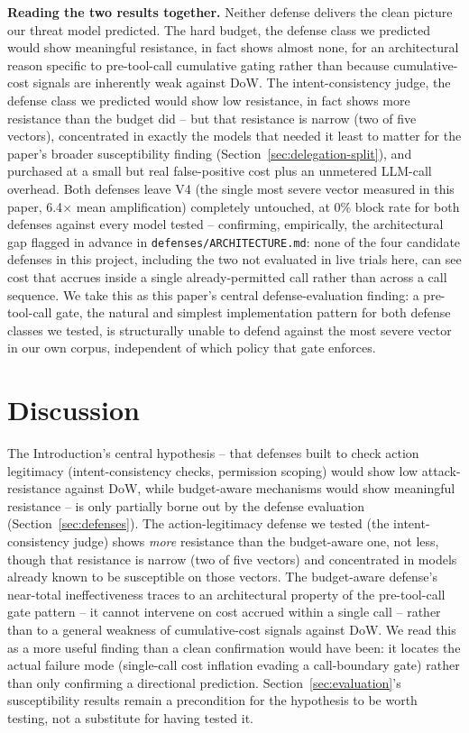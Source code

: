 \documentclass[conference]{IEEEtran}
\begin{document}
\textbf{Reading the two results together.} Neither defense delivers the clean picture our threat model predicted. The hard budget, the defense class we predicted would show meaningful resistance, in fact shows almost none, for an architectural reason specific to pre-tool-call cumulative gating rather than because cumulative-cost signals are inherently weak against DoW. The intent-consistency judge, the defense class we predicted would show low resistance, in fact shows more resistance than the budget did -- but that resistance is narrow (two of five vectors), concentrated in exactly the models that needed it least to matter for the paper's broader susceptibility finding (Section~\ref{sec:delegation-split}), and purchased at a small but real false-positive cost plus an unmetered LLM-call overhead. Both defenses leave V4 (the single most severe vector measured in this paper, 6.4$\times$ mean amplification) completely untouched, at 0\% block rate for both defenses against every model tested -- confirming, empirically, the architectural gap flagged in advance in \texttt{defenses/ARCHITECTURE.md}: none of the four candidate defenses in this project, including the two not evaluated in live trials here, can see cost that accrues inside a single already-permitted call rather than across a call sequence. We take this as this paper's central defense-evaluation finding: a pre-tool-call gate, the natural and simplest implementation pattern for both defense classes we tested, is structurally unable to defend against the most severe vector in our own corpus, independent of which policy that gate enforces.

\section{Discussion}
\label{sec:discussion}

The Introduction's central hypothesis -- that defenses built to check action legitimacy (intent-consistency checks, permission scoping) would show low attack-resistance against DoW, while budget-aware mechanisms would show meaningful resistance -- is only partially borne out by the defense evaluation (Section~\ref{sec:defenses}). The action-legitimacy defense we tested (the intent-consistency judge) shows \emph{more} resistance than the budget-aware one, not less, though that resistance is narrow (two of five vectors) and concentrated in models already known to be susceptible on those vectors. The budget-aware defense's near-total ineffectiveness traces to an architectural property of the pre-tool-call gate pattern -- it cannot intervene on cost accrued within a single call -- rather than to a general weakness of cumulative-cost signals against DoW. We read this as a more useful finding than a clean confirmation would have been: it locates the actual failure mode (single-call cost inflation evading a call-boundary gate) rather than only confirming a directional prediction. Section~\ref{sec:evaluation}'s susceptibility results remain a precondition for the hypothesis to be worth testing, not a substitute for having tested it.
\end{document}
